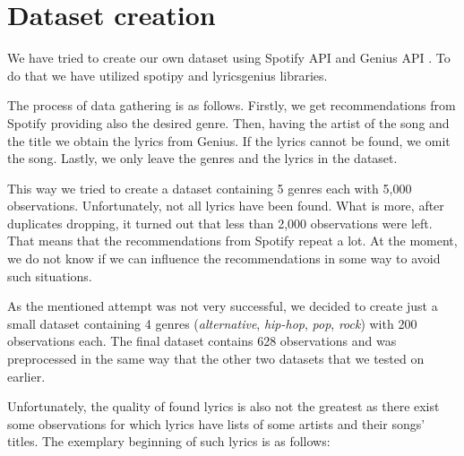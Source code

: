 \section{Dataset creation}
We have tried to create our own dataset using Spotify API \cite{Spotify} and Genius API \cite{Genius}. To do that we have utilized spotipy \cite{Spotipy} and lyricsgenius \cite{LyricsGenius} libraries. 

The process of data gathering is as follows. Firstly, we get recommendations from Spotify providing also the desired genre. Then, having the artist of the song and the title we obtain the lyrics from Genius. If the lyrics cannot be found, we omit the song. Lastly, we only leave the genres and the lyrics in the dataset.

This way we tried to create a dataset containing 5 genres each with 5,000 observations. Unfortunately, not all lyrics have been found. What is more, after duplicates dropping, it turned out that less than 2,000 observations were left. That means that the recommendations from Spotify repeat a lot. At the moment, we do not know if we can influence the recommendations in some way to avoid such situations.

As the mentioned attempt was not very successful, we decided to create just a small dataset containing 4 genres (\textit{alternative}, \textit{hip-hop}, \textit{pop}, \textit{rock}) with 200 observations each. The final dataset contains 628 observations and was preprocessed in the same way that the other two datasets that we tested on earlier.

Unfortunately, the quality of found lyrics is also not the greatest as there exist some observations for which lyrics have lists of some artists and their songs' titles. The exemplary beginning of such lyrics is as follows: 

